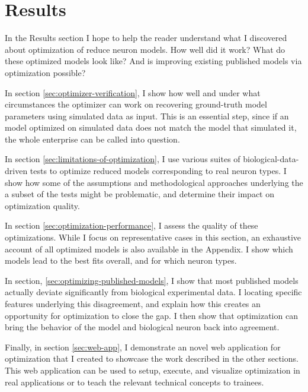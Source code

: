 \chapter{Results}
In the Results section I hope to help the reader understand what I discovered about optimization of reduce neuron models.
How well did it work?
What do these optimized models look like?
And is improving existing published models via optimization possible?

In section \ref{sec:optimizer-verification}, I show how well and under what circumstances the optimizer can work on recovering ground-truth model parameters using simulated data as input.
This is an essential step, since if an model optimized on simulated data does not match the model that simulated it, the whole enterprise can be called into question.

In section \ref{sec:limitations-of-optimization}, I use various suites of biological-data-driven tests to optimize reduced models corresponding to real neuron types.
I show how some of the assumptions and methodological approaches underlying the a subset of the tests might be problematic, and determine their impact on optimization quality. 

In section \ref{sec:optimization-performance}, I assess the quality of these optimizations. 
While I focus on representative cases in this section, an exhaustive account of all optimized models is also available in the Appendix.
I show which models lead to the best fits overall, and for which neuron types.

In section, \ref{sec:optimizing-published-models}, I show that most published models actually deviate significantly from biological experimental data.
I locating specific features underlying this disagreement, and explain how this creates an opportunity for optimization to close the gap.
I then show that optimization can bring the behavior of the model and biological neuron back into agreement.

Finally, in section \ref{sec:web-app}, I demonstrate an novel web application for optimization that I created to showcase the work described in the other sections.
This web application can be used to setup, execute, and visualize optimization in real applications or to teach the relevant technical concepts to trainees.


 


 






